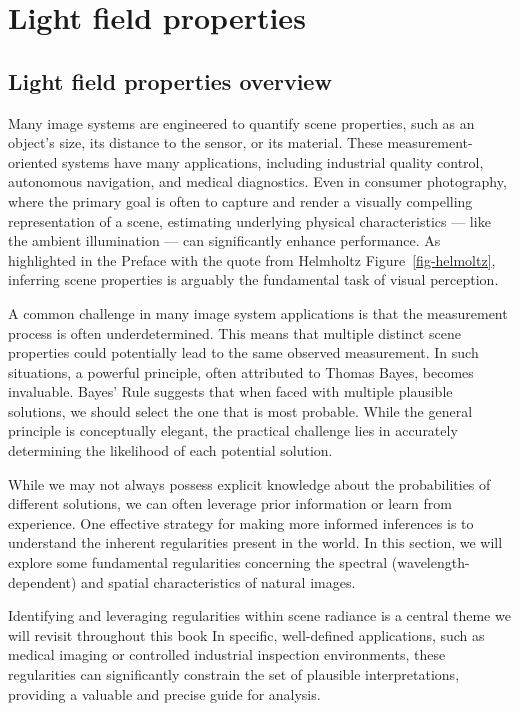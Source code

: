 \documentclass[
  letterpaper,
]{book}
\begin{document}
\chapter{Light field properties}\label{sec-lightfield-properties}

\section{Light field properties
overview}\label{light-field-properties-overview}

Many image systems are engineered to quantify scene properties, such as
an object's size, its distance to the sensor, or its material. These
measurement-oriented systems have many applications, including
industrial quality control, autonomous navigation, and medical
diagnostics. Even in consumer photography, where the primary goal is
often to capture and render a visually compelling representation of a
scene, estimating underlying physical characteristics --- like the
ambient illumination --- can significantly enhance performance. As
highlighted in the Preface with the quote from Helmholtz
Figure~\ref{fig-helmoltz}, inferring scene properties is arguably the
fundamental task of visual perception.

A common challenge in many image system applications is that the
measurement process is often underdetermined. This means that multiple
distinct scene properties could potentially lead to the same observed
measurement. In such situations, a powerful principle, often attributed
to Thomas Bayes, becomes invaluable. Bayes' Rule suggests that when
faced with multiple plausible solutions, we should select the one that
is most probable. While the general principle is conceptually elegant,
the practical challenge lies in accurately determining the likelihood of
each potential solution.

While we may not always possess explicit knowledge about the
probabilities of different solutions, we can often leverage prior
information or learn from experience. One effective strategy for making
more informed inferences is to understand the inherent regularities
present in the world. In this section, we will explore some fundamental
regularities concerning the spectral (wavelength-dependent) and spatial
characteristics of natural images.

Identifying and leveraging regularities within scene radiance is a
central theme we will revisit throughout this book In specific,
well-defined applications, such as medical imaging or controlled
industrial inspection environments, these regularities can significantly
constrain the set of plausible interpretations, providing a valuable and
precise guide for analysis.
\end{document}

